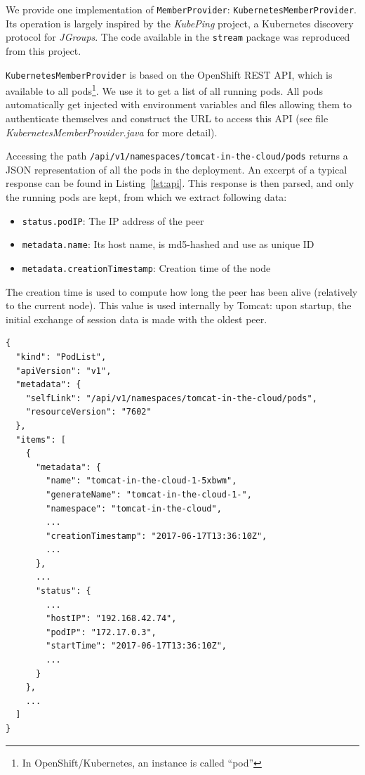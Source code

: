\documentclass[11pt,a4paper]{article}
\begin{document}
We provide one implementation of \texttt{MemberProvider}: \texttt{KubernetesMemberProvider}. Its operation is largely inspired by the \emph{KubePing} project\autocite{kubeping}, a Kubernetes discovery protocol for \emph{JGroups}. The code available in the \texttt{stream} package was reproduced from this project.

\texttt{KubernetesMemberProvider} is based on the OpenShift REST API\autocite{openshift-api}, which is available to all pods\footnote{In OpenShift/Kubernetes, an instance is called ``pod''}. We use it to get a list of all running pods. All pods automatically get injected with environment variables and files allowing them to authenticate themselves and construct the URL to access this API (see file \emph{KubernetesMemberProvider.java} for more detail).

Accessing the path \texttt{/api/v1/namespaces/tomcat-in-the-cloud/pods} returns a JSON representation of all the pods in the deployment. An excerpt of a typical response can be found in Listing~\ref{lst:api}. This response is then parsed, and only the running pods are kept, from which we extract following data:

\begin{itemize}
  \item \texttt{status.podIP}: The IP address of the peer
  \item \texttt{metadata.name}: Its host name, is md5-hashed and use as unique ID
  \item \texttt{metadata.creationTimestamp}: Creation time of the node
\end{itemize}

The creation time is used to compute how long the peer has been alive (relatively to the current node). This value is used internally by Tomcat: upon startup, the initial exchange of session data is made with the oldest peer.

\begin{lstlisting}[caption=Pod list returned by the API (excerpt),label=lst:api,float,floatplacement=H]
{
  "kind": "PodList",
  "apiVersion": "v1",
  "metadata": {
    "selfLink": "/api/v1/namespaces/tomcat-in-the-cloud/pods",
    "resourceVersion": "7602"
  },
  "items": [
    {
      "metadata": {
        "name": "tomcat-in-the-cloud-1-5xbwm",
        "generateName": "tomcat-in-the-cloud-1-",
        "namespace": "tomcat-in-the-cloud",
        ...
        "creationTimestamp": "2017-06-17T13:36:10Z",
        ...
      },
      ...
      "status": {
        ...
        "hostIP": "192.168.42.74",
        "podIP": "172.17.0.3",
        "startTime": "2017-06-17T13:36:10Z",
        ...
      }
    },
    ...
  ]
}
\end{lstlisting}
\end{document}
